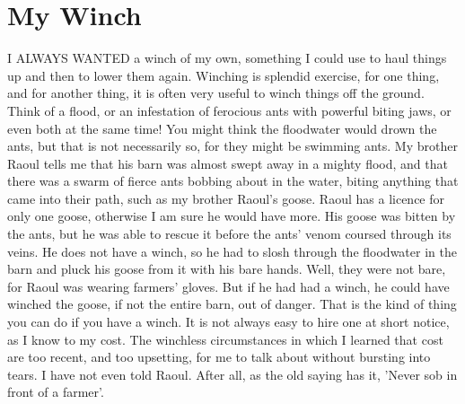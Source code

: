 \chapter{My Winch}

I ALWAYS WANTED a winch of my own, something I could use to haul things up and then to lower them again. Winching is splendid exercise, for one thing, and for another thing, it is often very useful to winch things off the ground. Think of a flood, or an infestation of ferocious ants with powerful biting jaws, or even both at the same time! You might think the floodwater would drown the ants, but that is not necessarily so, for they might be swimming ants. My brother Raoul tells me that his barn was almost swept away in a mighty flood, and that there was a swarm of fierce ants bobbing about in the water, biting anything that came into their path, such as my brother Raoul's goose. Raoul has a licence for only one goose, otherwise I am sure he would have more. His goose was bitten by the ants, but he was able to rescue it before the ants' venom coursed through its veins. He does not have a winch, so he had to slosh through the floodwater in the barn and pluck his goose from it with his bare hands. Well, they were not bare, for Raoul was wearing farmers' gloves. But if he had had a winch, he could have winched the goose, if not the entire barn, out of danger. That is the kind of thing you can do if you have a winch. It is not always easy to hire one at short notice, as I know to my cost. The winchless circumstances in which I learned that cost are too recent, and too upsetting, for me to talk about without bursting into tears. I have not even told Raoul. After all, as the old saying has it, 'Never sob in front of a farmer'.